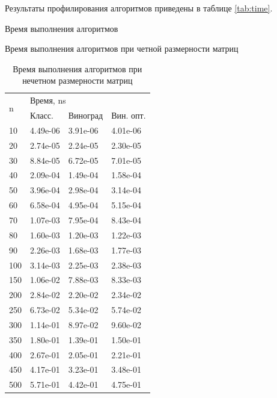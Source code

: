 Результаты профилирования алгоритмов приведены в таблице \ref{tab:time}.
\begin{table}[ht!]
	\captionsetup{singlelinecheck = false, justification=raggedleft}
	\caption{Время выполнения алгоритмов}
	\renewcommand{\arraystretch}{1.4}
	\begin{subtable}[ht!]{0.45\textwidth}
		\centering
		\caption{Время выполнения алгоритмов при четной размерности матриц}
		\begin{tabular}{||l|l|l|l||}
			\hline
			\multirow{2}{*}{n} & \multicolumn{3}{l||}{Время, ns} \\ \cline{2-4} 
			&  Класс. & Виноград & Вин. опт. \\ \hline\hline
			10 & 4.49e-06 & 3.91e-06 & 4.01e-06 \\ \hline 
			20 & 2.74e-05 & 2.24e-05 & 2.30e-05 \\ \hline 
			30 & 8.84e-05 & 6.72e-05 & 7.01e-05 \\ \hline 
			40 & 2.09e-04 & 1.49e-04 & 1.58e-04 \\ \hline 
			50 & 3.96e-04 & 2.98e-04 & 3.14e-04 \\ \hline 
			60 & 6.58e-04 & 4.95e-04 & 5.15e-04 \\ \hline 
			70 & 1.07e-03 & 7.95e-04 & 8.43e-04 \\ \hline 
			80 & 1.60e-03 & 1.20e-03 & 1.22e-03 \\ \hline 
			90 & 2.26e-03 & 1.68e-03 & 1.77e-03 \\ \hline 
			100 & 3.14e-03 & 2.25e-03 & 2.38e-03 \\ \hline 
			150 & 1.06e-02 & 7.88e-03 & 8.33e-03 \\ \hline 
			200 & 2.84e-02 & 2.20e-02 & 2.34e-02 \\ \hline 
			250 & 6.73e-02 & 5.34e-02 & 5.74e-02 \\ \hline 
			300 & 1.14e-01 & 8.97e-02 & 9.60e-02 \\ \hline 
			350 & 1.80e-01 & 1.39e-01 & 1.50e-01 \\ \hline 
			400 & 2.67e-01 & 2.05e-01 & 2.21e-01 \\ \hline 
			450 & 4.17e-01 & 3.23e-01 & 3.48e-01 \\ \hline 
			500 & 5.71e-01 & 4.42e-01 & 4.75e-01 \\ \hline 
		\end{tabular}
		\label{tab:odd}
	\end{subtable}
	\hfill
	\begin{subtable}[ht!]{0.45\textwidth}
		\centering
		\caption{Время выполнения алгоритмов при нечетном размерности матриц}

\end{subtable}
\end{table}
